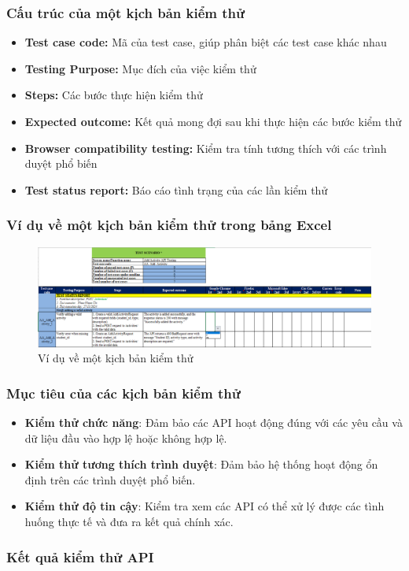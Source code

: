 \subsubsection{Cấu trúc của một kịch bản kiểm thử}

\begin{itemize}
    \item \textbf{Test case code:} Mã của test case, giúp phân biệt các test case khác nhau
    \item \textbf{Testing Purpose:} Mục đích của việc kiểm thử
    \item \textbf{Steps:} Các bước thực hiện kiểm thử
    \item \textbf{Expected outcome:} Kết quả mong đợi sau khi thực hiện các bước kiểm thử
    \item \textbf{Browser compatibility testing:} Kiểm tra tính tương thích với các trình duyệt phổ biến
    \item \textbf{Test status report:} Báo cáo tình trạng của các lần kiểm thử
\end{itemize}

\subsubsection{Ví dụ về một kịch bản kiểm thử trong bảng Excel}
\begin{figure}[H]
    \centering
    \includegraphics[scale=0.5]{Images/Implement/testScenario.png}
    \caption{Ví dụ về một kịch bản kiểm thử}
\end{figure}
\subsubsection{Mục tiêu của các kịch bản kiểm thử}
\begin{itemize}
    \item \textbf{Kiểm thử chức năng}: Đảm bảo các API hoạt động đúng với các yêu cầu và dữ liệu đầu vào hợp lệ hoặc không hợp lệ. 
    \item \textbf{Kiểm thử tương thích trình duyệt}: Đảm bảo hệ thống hoạt động ổn định trên các trình duyệt phổ biến.
    \item \textbf{Kiểm thử độ tin cậy}: Kiểm tra xem các API có thể xử lý được các tình huống thực tế và đưa ra kết quả chính xác.
\end{itemize}
\subsubsection{Kết quả kiểm thử API}
